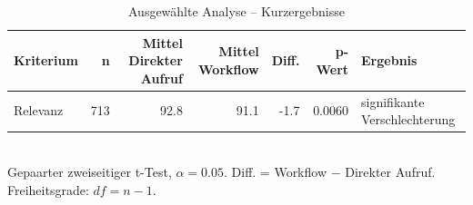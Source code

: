 \begin{table}[htbp]
\centering
\caption{Ausgewählte Analyse -- Kurzergebnisse}
\begin{tabular}{lrrrrrl}
\toprule
Kriterium & n & Mittel Direkter Aufruf & Mittel Workflow & Diff. & p-Wert & Ergebnis \\
\midrule
Relevanz & 713 & 92.8 & 91.1 & -1.7 & 0.0060 & signifikante Verschlechterung \\
\bottomrule
\end{tabular}
\\[2mm]
\footnotesize Gepaarter zweiseitiger t-Test, $\alpha=0.05$. Diff. = Workflow $-$ Direkter Aufruf. Freiheitsgrade: $df=n-1$.
\end{table}
